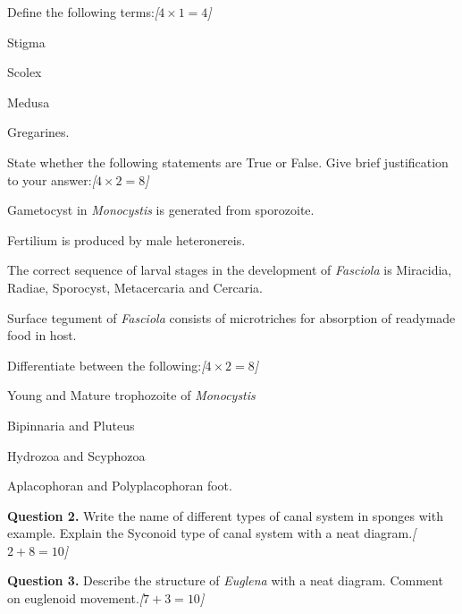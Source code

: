 \documentclass[11pt,a4paper]{article}
\newcommand{\pts}[1]{\hfill   \textit{[#1]}}
\begin{document}
\begin{parts}
  \item Define the following terms:\pts{$4  \times 1 = 4$}
  
\begin{parts}
    \item Stigma
    \item Scolex
    \item Medusa
    \item Gregarines.
  \end{parts}

  \item State whether the following statements are True or False. Give brief justification to your answer:\pts{$4  \times 2 = 8$}
  
\begin{parts}
    \item Gametocyst in   \textit{Monocystis} is generated from sporozoite.
    \item Fertilium is produced by male heteronereis.
    \item The correct sequence of larval stages in the development of   \textit{Fasciola} is Miracidia, Radiae, Sporocyst, Metacercaria and Cercaria.
    \item Surface tegument of   \textit{Fasciola} consists of microtriches for absorption of readymade food in host.
  \end{parts}

  \item Differentiate between the following:\pts{$4  \times 2 = 8$}
  
\begin{parts}
    \item Young and Mature trophozoite of   \textit{Monocystis}
    \item Bipinnaria and Pluteus
    \item Hydrozoa and Scyphozoa
    \item Aplacophoran and Polyplacophoran foot.
  \end{parts}
\end{parts}

\pagebreak

\medskip


\noindent   \textbf{Question 2.} Write the name of different types of canal system in sponges with example. Explain the Syconoid type of canal system with a neat diagram.\pts{$2 + 8 = 10$}

\medskip


\noindent   \textbf{Question 3.} Describe the structure of   \textit{Euglena} with a neat diagram. Comment on euglenoid movement.\pts{$7 + 3 = 10$}
\end{document}
